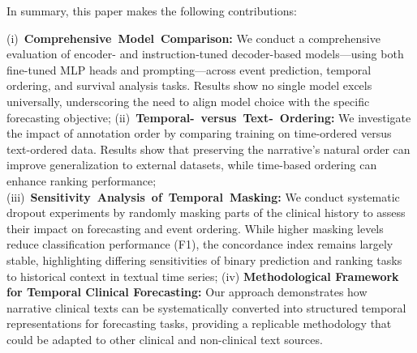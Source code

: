 {\raggedright
In summary, this paper makes the following contributions:

\mbox{(i) \textbf{Comprehensive Model Comparison:}}
    We conduct a comprehensive evaluation of encoder- and instruction-tuned decoder-based models—using both fine-tuned MLP heads and prompting—across event prediction, temporal ordering, and survival analysis tasks.
Results show no single model excels universally, underscoring the need to align model choice with the specific forecasting objective;
\mbox{(ii) \textbf{Temporal- versus Text- Ordering:}}
    We investigate the impact of annotation order by comparing training on time-ordered versus text-ordered data.
Results show that preserving the narrative's natural order can improve generalization to external datasets, while time-based ordering can enhance ranking performance;
\mbox{(iii) \textbf{Sensitivity Analysis of Temporal Masking:}}
    We conduct systematic dropout experiments by randomly masking parts of the clinical history to assess their impact on forecasting and event ordering.
While higher masking levels reduce classification performance (F1), the concordance index remains largely stable, highlighting differing sensitivities of binary prediction and ranking tasks to historical context in textual time series;
(iv) \textbf{Methodological Framework for Temporal Clinical Forecasting:} Our approach demonstrates how narrative clinical texts can be systematically converted into structured temporal representations for forecasting tasks, providing a replicable methodology that could be adapted to other clinical and non-clinical text sources.


\par}
